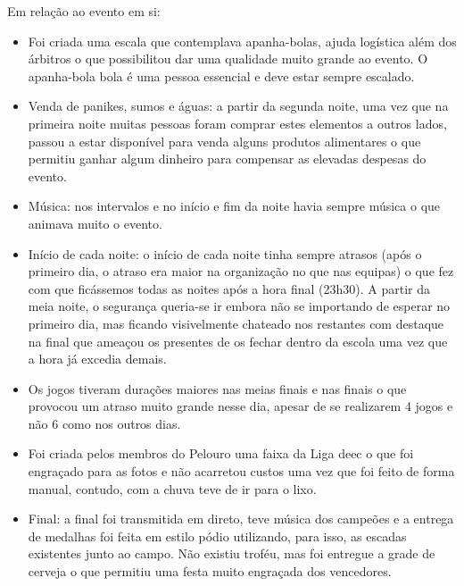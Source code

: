Em relação ao evento em si:
\begin{itemize}
\item Foi criada uma escala que contemplava apanha-bolas, ajuda logística além dos árbitros o que possibilitou dar uma qualidade muito grande ao evento. O apanha-bola bola é uma pessoa essencial e deve estar sempre escalado.
\item Venda de panikes, sumos e águas: a partir da segunda noite, uma vez que na primeira noite muitas pessoas foram comprar estes elementos a outros lados, passou a estar disponível para venda alguns produtos alimentares o que permitiu ganhar algum dinheiro para compensar as elevadas despesas do evento.
\item Música: nos intervalos e no início e fim da noite havia sempre música o que animava muito o evento.
\item Início de cada noite: o início de cada noite tinha sempre atrasos (após o primeiro dia, o atraso era maior na organização no que nas equipas) o que fez com que ficássemos todas as noites após a hora final (23h30). A partir da meia noite, o segurança queria-se ir embora não se importando de esperar no primeiro dia, mas ficando visivelmente chateado nos restantes com destaque na final que ameaçou os presentes de os fechar dentro da escola uma vez que a hora já excedia demais.
\item Os jogos tiveram durações maiores nas meias finais e nas finais o que provocou um atraso muito grande nesse dia, apesar de se realizarem 4 jogos e não 6 como nos outros dias.
\item Foi criada pelos membros do Pelouro uma faixa da Liga \acrshort{deec} o que foi engraçado para as fotos e não acarretou custos uma vez que foi feito de forma manual, contudo, com a chuva teve de ir para o lixo.
\item Final: a final foi transmitida em direto, teve música dos campeões e a entrega de medalhas foi feita em estilo pódio utilizando, para isso, as escadas existentes junto ao campo. Não existiu troféu, mas foi entregue a grade de cerveja o que permitiu uma festa muito engraçada dos vencedores.
\end{itemize}
